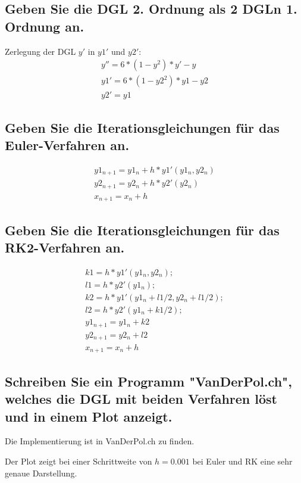\documentclass[10pt,a4paper]{article}
\begin{document}
\subsection{Geben Sie die DGL 2. Ordnung als 2 DGLn 1. Ordnung an.}

Zerlegung der DGL $y'$ in $y1'$ und $y2'$:
\begin{align}
y'' = 6 * (1-y^2) * y' - y
\\y1' = 6 * (1-y2^2) * y1 - y2
\\y2' = y1
\end{align}

\subsection{Geben Sie die Iterationsgleichungen für das Euler-Verfahren an.}

\begin{align}
y1_{n+1} = y1_n + h * y1'(y1_n,y2_n)
\\y2_{n+1} = y2_n + h * y2'(y2_n)
\\x_{n+1} = x_n + h
\end{align}

\subsection{Geben Sie die Iterationsgleichungen für das RK2-Verfahren an.}

\begin{align}
k1 = h * y1'(y1_n, y2_n);
\\l1 = h * y2'(y1_n);
\\k2 = h * y1'(y1_n + l1/2, y2_n + l1/2);
\\l2 = h * y2'(y1_n + k1/2);
\\y1_{n+1} = y1_n + k2
\\y2_{n+1} = y2_n + l2
\\x_{n+1} = x_n + h
\end{align}

\subsection{Schreiben Sie ein Programm "VanDerPol.ch", welches die DGL mit beiden
Verfahren löst und in einem Plot anzeigt.}

Die Implementierung ist in VanDerPol.ch zu finden.

Der Plot zeigt bei einer Schrittweite von $h = 0.001$ bei Euler und RK eine sehr genaue Darstellung.
\end{document}
